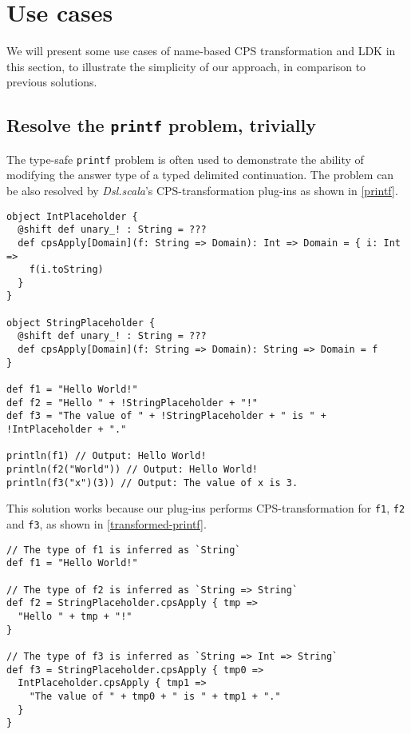 \appendix

\section{Use cases}

We will present some use cases of name-based CPS transformation and LDK in this section, to illustrate the simplicity of our approach, in comparison to previous solutions.

\subsection{Resolve the \lstinline{printf} problem, trivially}\label{resolve-printf-problem}

The type-safe \lstinline{printf} problem \cite{danvy1998functional} is often used to demonstrate the ability of modifying the answer type of a typed delimited continuation. The problem can be also resolved by \textit{Dsl.scala}'s CPS-transformation plug-ins as shown in \cref{printf}.

\begin{lstlisting}[caption={A solution of the type-safe \lstinline{printf} problem in \textit{Dsl.scala}},label={printf}]
object IntPlaceholder {
  @shift def unary_! : String = ???
  def cpsApply[Domain](f: String => Domain): Int => Domain = { i: Int =>
    f(i.toString)
  }
}

object StringPlaceholder {
  @shift def unary_! : String = ???
  def cpsApply[Domain](f: String => Domain): String => Domain = f
}

def f1 = "Hello World!"
def f2 = "Hello " + !StringPlaceholder + "!"
def f3 = "The value of " + !StringPlaceholder + " is " + !IntPlaceholder + "."

println(f1) // Output: Hello World!
println(f2("World")) // Output: Hello World!
println(f3("x")(3)) // Output: The value of x is 3.
\end{lstlisting}

This solution works because our plug-ins performs CPS-transformation for \lstinline{f1}, \lstinline{f2} and \lstinline{f3}, as shown in \cref{transformed-printf}.

\begin{lstlisting}[caption={The translated source code of \lstinline{Dsl.scala}-base solution of \lstinline{printf} problem},label={transformed-printf}]
// The type of f1 is inferred as `String`
def f1 = "Hello World!"

// The type of f2 is inferred as `String => String`
def f2 = StringPlaceholder.cpsApply { tmp =>
  "Hello " + tmp + "!"
}

// The type of f3 is inferred as `String => Int => String`
def f3 = StringPlaceholder.cpsApply { tmp0 =>
  IntPlaceholder.cpsApply { tmp1 =>
    "The value of " + tmp0 + " is " + tmp1 + "."
  }
}
\end{lstlisting}


